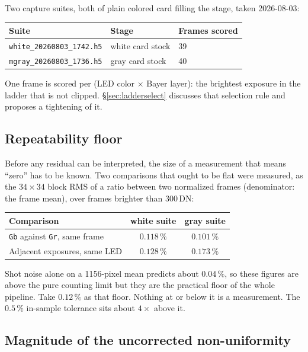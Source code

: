 \documentclass[11pt, a4paper]{article}
\newcommand{\code}[1]{\texttt{#1}}
\newcommand{\pct}{\,\%}
\begin{document}
Two capture suites, both of plain colored card filling the stage,
taken 2026-08-03:

\begin{center}
\begin{tabular}{lll}
\toprule
Suite & Stage & Frames scored \\
\midrule
\code{white\_20260803\_1742.h5} & white card stock  & 39 \\
\code{mgray\_20260803\_1736.h5} & gray card stock   & 40 \\
\bottomrule
\end{tabular}
\end{center}

One frame is scored per (LED color $\times$ Bayer layer):
the brightest exposure in the ladder that is not clipped.
\S\ref{sec:ladderselect} discusses that selection rule
and proposes a tightening of it.

\subsection{Repeatability floor}
\label{sec:floor}

Before any residual can be interpreted,
the size of a measurement that means ``zero'' has to be known.
Two comparisons that ought to be flat were measured,
as the $34\times34$ block RMS of a ratio between two normalized frames
(denominator: the frame mean),
over frames brighter than 300\,DN:

\begin{center}
\begin{tabular}{lcc}
\toprule
Comparison & white suite & gray suite \\
\midrule
\code{Gb} against \code{Gr}, same frame   & $0.118\pct$ & $0.101\pct$ \\
Adjacent exposures, same LED              & $0.128\pct$ & $0.173\pct$ \\
\bottomrule
\end{tabular}
\end{center}

Shot noise alone on a 1156-pixel mean predicts about $0.04\pct$,
so these figures are above the pure counting limit
but they are the practical floor of the whole pipeline.
Take $0.12\pct$ as that floor.
Nothing at or below it is a measurement.
The $0.5\pct$ in-sample tolerance sits about $4\times$ above it.

\subsection{Magnitude of the uncorrected non-uniformity}
\end{document}
